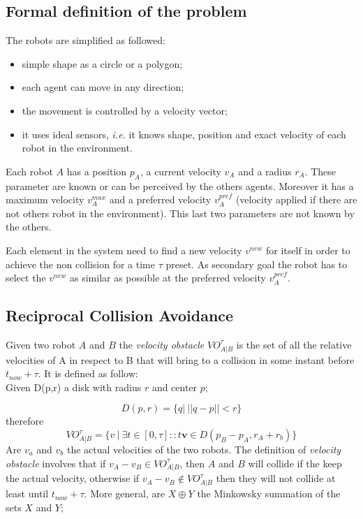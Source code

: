 \documentclass[11pt,twocolumn]{article}
\begin{document}
\subsection{Formal definition of the problem}
The robots are simplified as followed:
\begin{itemize}
\item simple shape as a circle or a polygon;
\item each agent can move in any direction;
\item the movement is controlled by a velocity vector;
\item it uses ideal sensors, \textit{ i.e.} it knows shape, position and exact velocity of each robot in the environment. 
\end{itemize}
\par
Each robot $A$ has a position $p_A$, a current velocity $v_A$ and a radius $r_A$. These parameter are known or can be perceived by the others agents. Moreover it has a maximum velocity $v^{max}_A$ and a preferred velocity $v^{pref}_A$ (velocity applied if there are not others robot in the environment). This last two parameters are not known by the others.
\par
Each element in the system need to find a new velocity $v^{new}$ for itself in order to achieve the non collision for a time  \(\tau\) preset. As secondary goal the robot has to select the $v^{new}$ as similar as possible at the preferred velocity $v_A^{pref}$.

\subsection{Reciprocal Collision Avoidance}

Given two robot $A$ and $B$ the  \textit{velocity obstacle} $ VO_{A|B}^\tau$ is the set of all the relative velocities of A in respect to B that will bring to a collision in some instant before $t_{now}+\tau$. It is defined as follow:\\
Given D(p,r) a disk with radius $r$ and center $p$;

\begin{equation}
D(p,r) = \{q|\  ||q-p|| < r\}
\end{equation}
therefore
\begin{equation}
VO_{A|B}^\tau= \{v \ |\ \exists t \in [0,\tau ] :: \textit{t}\textbf{v}\in D(p_B - p_A , r_A+r_b)\}
\end{equation}
Are $v_a$ and $v_b$ the actual velocities of the two robots. The definition of \textit{velocity obstacle} involves that if $v_A-v_B \in VO_{A|B}^\tau$, then $A$ and $B$ will collide if the keep the actual velocity, otherwise if $v_A - v_B \notin VO^\tau_{A|B}$ then they will not collide at least until $t_{now}+\tau$. More general, are $X \oplus Y$ the Minkowsky summation of the sets $X$ and $Y$;
\end{document}
